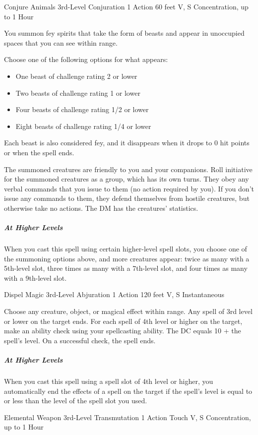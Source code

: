 {\DndSpellHeader
  {Conjure Animals}
  {3rd-Level Conjuration}
  {1 Action}
  {60 feet}
  {V, S}
  {Concentration, up to 1 Hour}

You summon fey spirits that take the form of beasts and appear in unoccupied spaces that you can see within range.

Choose one of the following options for what appears:
\begin{itemize}
	\item One beast of challenge rating 2 or lower
	\item Two beasts of challenge rating 1 or lower
	\item Four beasts of challenge rating 1/2 or lower
	\item Eight beasts of challenge rating 1/4 or lower
\end{itemize}
Each beast is also considered fey, and it disappears when it drops to 0 hit points or when the spell ends.

The summoned creatures are friendly to you and your companions. Roll initiative for the summoned creatures as a group, which has its own turns. They obey any verbal commands that you issue to them (no action required by you). If you don’t issue any commands to them, they defend themselves from hostile creatures, but otherwise take no actions. The DM has the creatures’ statistics.

\subparagraph*{At Higher Levels} When you cast this spell using certain higher-level spell slots, you choose one of the summoning options above, and more creatures appear: twice as many with a 5th-level slot, three times as many with a 7th-level slot, and four times as many with a 9th-level slot.

\DndSpellHeader
  {Dispel Magic}
  {3rd-Level Abjuration}
  {1 Action}
  {120 feet}
  {V, S}
  {Instantaneous}

Choose any creature, object, or magical effect within range. Any spell of 3rd level or lower on the target ends. For each spell of 4th level or higher on the target, make an ability check using your spellcasting ability. The DC equals 10 + the spell's level. On a successful check, the spell ends.

\subparagraph*{At Higher Levels} When you cast this spell using a spell slot of 4th level or higher, you automatically end the effects of a spell on the target if the spell's level is equal to or less than the level of the spell slot you used.

\DndSpellHeader
  {Elemental Weapon}
  {3rd-Level Transmutation}
  {1 Action}
  {Touch}
  {V, S}
  {Concentration, up to 1 Hour}

}
